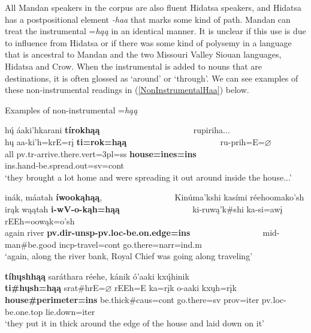 All Mandan speakers in the corpus are also fluent Hidatsa speakers, and Hidatsa has a postpositional element \textit{-haa} that marks some kind of path. Mandan can treat the instrumental =\textit{hąą} in an identical manner. It is unclear if this use is due to influence from Hidatsa or if there was some kind of polysemy in a language that is ancestral to Mandan and the two Missouri Valley Siouan languages, Hidatsa and Crow. When the instrumental is added to nouns that are destinations, it is often glossed as `around' or `through'. We can see examples of these non-instrumental readings in (\ref{NonInstrumentalHaa}) below.

\begin{exe}

\item\label{NonInstrumentalHaa} Examples of non-instrumental =\textit{hąą}

\begin{xlist}

\item\label{NonInstrumentalHaa1} \glll hų́ áaki'hkarani \textbf{tírokhąą} ~ ~ ~ ~ ~ ~ ~ ~ ~ ~ ~ ~ ~  rupiriha...\\
    hų aa-ki'h=krE=rį \textbf{ti=rok=hąą} ~ ~ ~ ~ ~ ~ ~ ~ ~ ~ ~ ~ ~ ru-prih=E=$\varnothing$\\
    \textnormal{all} pv.tr-\textnormal{arrive.there}.vert=3pl=ss \textbf{\textnormal{\bfseries house}=ines=ins} ~ ~ ~ ~ ~ ~ ~ ~ ~ ~ ~ ~ ~  ins.hand-\textnormal{be.spread.out}=sv=cont\\
    \glt `they brought a lot home and were spreading it out around inside the house...' \citep[184]{hollow1973a}

\item\label{NonInstrumentalHaa2} \glll inák, máatah \textbf{íwookąhąą}, ~ ~ ~ ~ ~ ~ ~ ~ ~ ~  Kinúma'kshi kasími réehoomako'sh\\
    irąk wąątah \textbf{i-wV-o-kąh=hąą} ~ ~ ~ ~ ~ ~ ~ ~ ~ ~  ki-ruwą'k\#shi ka-si=awį rEEh=oowąk=o'sh\\
    \textnormal{again} \textnormal{river} \textbf{pv.dir-unsp-pv.loc-\textnormal{\bfseries be.on.edge}=ins} ~ ~ ~ ~ ~ ~ ~ ~ ~ ~ mid-\textnormal{man}\#\textnormal{be.good} incp-\textnormal{travel}=cont \textnormal{go.there}=narr=ind.m\\
    \glt `again, along the river bank, Royal Chief was going along traveling' \citep[14]{hollow1973a}

\item\label{NonInstrumentalHaa3} \glll \textbf{tíhųshhąą} saráthara réehe, kánik ó'aaki kxų́hinik\\
    \textbf{ti\#hųsh=hąą} srat\#hrE=$\varnothing$ rEEh=E ka=rįk o-aaki kxųh=rįk\\
    \textbf{\textnormal{\bfseries house}\#\textnormal{\bfseries perimeter}=ins} \textnormal{be.thick}\#caus=cont  \textnormal{go.there}=sv prov=iter pv.loc-\textnormal{be.one.top} \textnormal{lie.down}=iter\\
    \glt `they put it in thick around the edge of the house and laid down on it' \citep[184]{hollow1973a}


\end{xlist}
\end{exe}
